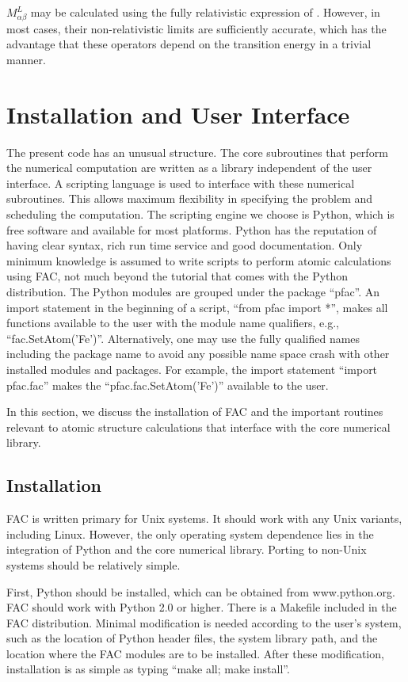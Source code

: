 \documentclass{elsart}
\begin{document}
$M^L_{\alpha\beta}$ may be calculated using the fully relativistic
expression of \citet{grant74}. However, in most cases, their non-relativistic
limits are sufficiently accurate, which has the advantage that these operators
depend on the transition energy in a trivial manner. 

\section{Installation and User Interface}
\label{sec_program}
The present code has an unusual structure. The core subroutines that
perform the numerical computation are written as a library independent of the
user interface. A scripting language is used to interface with these numerical
subroutines. This allows maximum flexibility in specifying the problem and
scheduling the computation. The scripting engine we choose is Python, 
which is free software and available for most
platforms. Python has the reputation of having clear syntax, rich run time
service and good documentation. Only minimum knowledge is assumed to write
scripts to perform atomic calculations using FAC, not much beyond the tutorial
that comes with the Python distribution. The Python modules are grouped under
the package ``pfac''. An import statement in the beginning of a script, 
``from pfac import *'', makes all functions available to the user with the
module name qualifiers, e.g., ``fac.SetAtom('Fe')''. Alternatively, one may
use the fully qualified names including the package name to avoid any possible
name space crash with other installed modules and packages. For example,
the import statement ``import pfac.fac'' makes the ``pfac.fac.SetAtom('Fe')''
available to the user. 

In this section, we discuss the
installation of FAC and the important routines relevant to atomic structure
calculations that interface with the core numerical library.

\subsection{Installation}
FAC is written primary for Unix systems. It should work with any Unix variants,
including Linux. However, the only operating system dependence lies in the
integration of Python and the core numerical library. Porting to 
non-Unix systems should be relatively simple. 

First, Python should be installed, which can be obtained from
www.python.org. FAC should work with Python 2.0 or higher. There is a Makefile
included in the FAC distribution. Minimal modification is needed according to
the user's system, such as the location of Python header files, the system
library path, and the location where the FAC modules are to be
installed. After these 
modification, installation is as simple as typing ``make all; make install''. 
\end{document}
